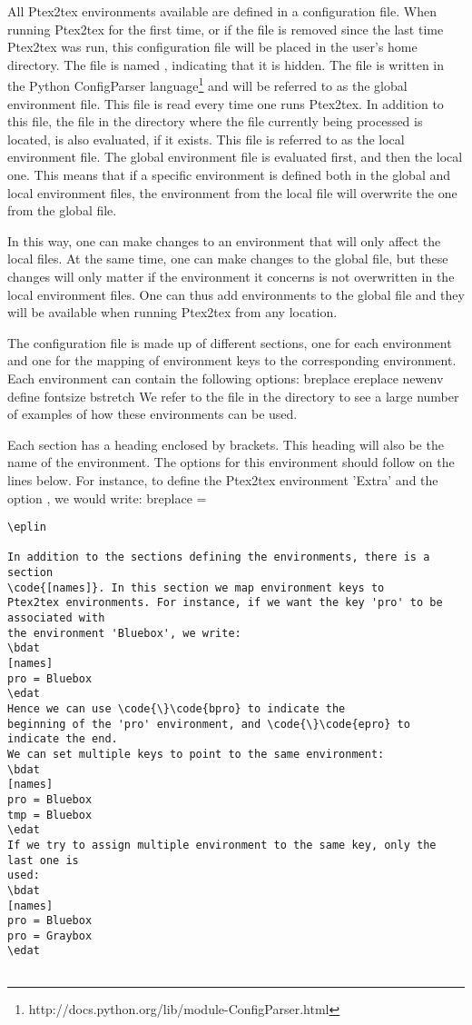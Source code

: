 \documentclass[a4paper,11pt]{article}
\begin{document}
{{{{{{{{{{{All Ptex2tex environments available are defined in a configuration
file. When running Ptex2tex for the first
time, or if the file is removed since the last time Ptex2tex was run,
this configuration file will be placed in the user's home directory. The file
is named , indicating that it is hidden. The file is
written in the Python ConfigParser
language\footnote{http://docs.python.org/lib/module-ConfigParser.html} and
will be referred to as the global environment file.
This file is read every time one runs Ptex2tex. In addition to
this file, the  file in the directory where the 
file currently being processed is located, is also evaluated, if it exists. This file is
referred to as the local environment file. The global environment
file is evaluated first, and then the local one. This means that if a
specific environment is defined both in the global and local environment
files, the environment from the local file will overwrite the one from the
global file.

In this way, one can make changes to an environment that will only affect the
local  files. At the same time, one can make changes to the
global file, but these changes will only matter if the environment it concerns
is not overwritten in the local environment files. One can thus add
environments to the global file and they will be available when running Ptex2tex
from any location. 

The configuration file is made up of different sections, one for each
environment and one for the mapping of environment keys to the
corresponding environment. Each environment can contain the following options:
\bdat
breplace
ereplace
newenv
define
fontsize
bstretch
\edat
We refer to the  file in the 
directory to see a large number of examples of how these environments
can be used.

Each section has a heading enclosed by brackets. This heading will also be the
name of the environment. The options for this environment should follow on the
lines below. For instance, to define the Ptex2tex environment 'Extra'
and the option , we would write:
\bplin
[Extra]
breplace = \begin{Verbatim}
\eplin

In addition to the sections defining the environments, there is a section
\code{[names]}. In this section we map environment keys to
Ptex2tex environments. For instance, if we want the key 'pro' to be associated with
the environment 'Bluebox', we write:
\bdat
[names]
pro = Bluebox
\edat
Hence we can use \code{\}\code{bpro} to indicate the
beginning of the 'pro' environment, and \code{\}\code{epro} to indicate the end.
We can set multiple keys to point to the same environment:
\bdat
[names]
pro = Bluebox
tmp = Bluebox
\edat
If we try to assign multiple environment to the same key, only the last one is
used:
\bdat
[names]
pro = Bluebox
pro = Graybox
\edat


\end{Verbatim}}}}}}}}}}}}
\end{document}
